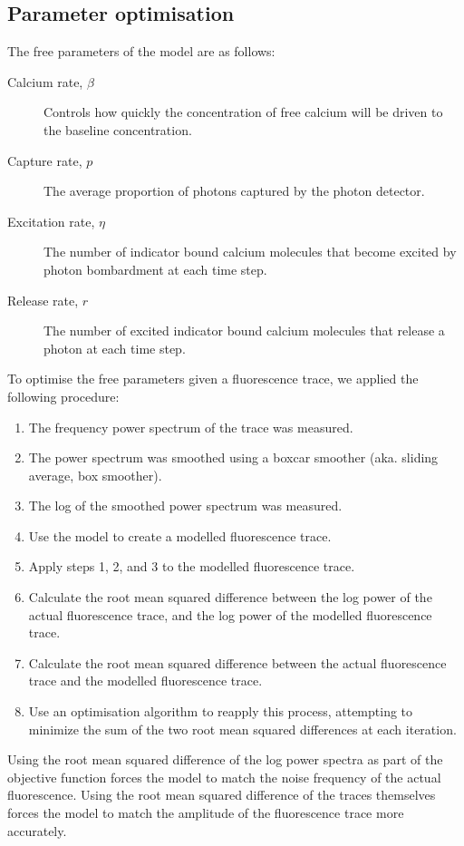 \subsection{Parameter optimisation}\label{sec:parameter_optimisation}
The free parameters of the model are as follows:
\begin{description}
    \item[Calcium rate, $\beta$] Controls how quickly the concentration of free calcium will be driven to the baseline concentration.
    \item[Capture rate, $p$] The average proportion of photons captured by the photon detector.
    \item[Excitation rate, $\eta$] The number of indicator bound calcium molecules that become excited by photon bombardment at each time step.
    \item[Release rate, $r$] The number of excited indicator bound calcium molecules that release a photon at each time step.
\end{description}
To optimise the free parameters given a fluorescence trace, we applied the following procedure:
\begin{enumerate}
    \item The frequency power spectrum of the trace was measured.
    \item The power spectrum was smoothed using a boxcar smoother (aka. sliding average, box smoother).
    \item The log of the smoothed power spectrum was measured.
    \item Use the model to create a modelled fluorescence trace.
    \item Apply steps 1, 2, and 3 to the modelled fluorescence trace.
    \item Calculate the root mean squared difference between the log power of the actual fluorescence trace, and the log power of the modelled fluorescence trace.
    \item Calculate the root mean squared difference between the actual fluorescence trace and the modelled fluorescence trace.
    \item Use an optimisation algorithm to reapply this process, attempting to minimize the sum of the two root mean squared differences at each iteration.
\end{enumerate}
Using the root mean squared difference of the log power spectra as part of the objective function forces the model to match the noise frequency of the actual fluorescence. Using the root mean squared difference of the traces themselves forces the model to match the amplitude of the fluorescence trace more accurately.

